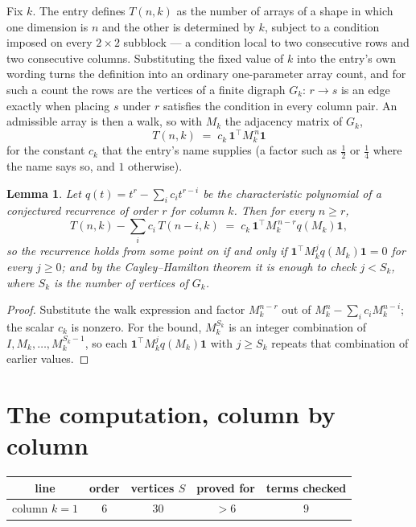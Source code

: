 \documentclass[11pt,a4paper]{article}
\theoremstyle{plain}
\newtheorem{lemma}[theorem]{Lemma}
\theoremstyle{definition}
\begin{document}
Fix $k$. The entry defines $T(n,k)$ as the number of arrays of a shape in which one dimension
is $n$ and the other is determined by $k$, subject to a condition imposed on every
$2\times2$ subblock --- a condition local to two consecutive rows and two consecutive columns.
Substituting the fixed value of $k$ into the entry's own wording turns the definition into an
ordinary one-parameter array count, and for such a count the rows are the vertices of a finite
digraph $G_k$: $r\to s$ is an edge exactly when placing $s$ under $r$ satisfies the condition
in every column pair. An admissible array is then a walk, so with $M_k$ the adjacency matrix
of $G_k$,
\[
T(n,k)\;=\;c_k\,\mathbf{1}^{\!\top}M_k^{\,n}\mathbf{1}
\]
for the constant $c_k$ that the entry's name supplies (a factor such as $\tfrac12$ or
$\tfrac14$ where the name says so, and $1$ otherwise).

\begin{lemma}\label{lem:crit}
Let $q(t)=t^{r}-\sum_i c_it^{r-i}$ be the characteristic polynomial of a conjectured
recurrence of order $r$ for column $k$. Then for every $n\ge r$,
\[
T(n,k)-\sum_i c_i\,T(n-i,k)\;=\;c_k\,\mathbf{1}^{\!\top}M_k^{\,n-r}q(M_k)\mathbf{1},
\]
so the recurrence holds from some point on if and only if
$\mathbf{1}^{\!\top}M_k^{j}q(M_k)\mathbf{1}=0$ for every $j\ge0$; and by the
Cayley--Hamilton theorem it is enough to check $j<S_k$, where $S_k$ is the number of vertices
of $G_k$.
\end{lemma}

\begin{proof}
Substitute the walk expression and factor $M_k^{n-r}$ out of $M_k^{n}-\sum_ic_iM_k^{n-i}$;
the scalar $c_k$ is nonzero. For the bound, $M_k^{S_k}$ is an integer combination of
$I,M_k,\dots,M_k^{S_k-1}$, so each $\mathbf{1}^{\!\top}M_k^{j}q(M_k)\mathbf{1}$ with
$j\ge S_k$ repeats that combination of earlier values.
\end{proof}

\section{The computation, column by column}

\begin{center}
\begin{tabular}{ccccc}
line & order & vertices $S$ & proved for & terms checked \\ \hline
column $k$$=1$ & $6$ & $30$ & $>6$ & $9$ \\
\end{tabular}
\end{center}
\end{document}

